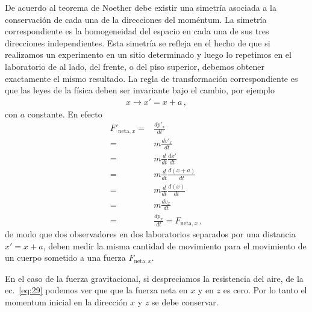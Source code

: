 De acuerdo al teorema de Noether debe existir una simetría asociada a
la conservación de cada una de la direcciones del moméntum. 
La simetría correspondiente es la homogeneidad del espacio en cada una
de sus tres direcciones independientes.
Esta simetría se refleja en el hecho de que si realizamos un
experimento en un sitio determinado y luego lo repetimos en el
laboratorio de al lado, del frente, o del piso superior, debemos
obtener exactamente el mismo resultado. 
La regla de transformación correspondiente es que las leyes de la física deben ser invariante bajo el cambio, por ejemplo
\begin{align*}
  x\to x'=x+a\,,
\end{align*}
con $a$ constante.
En efecto
\begin{align*}
  F'_{\text{neta},x}=&\frac{dp'_{x}}{dt}\nonumber\\
=&m\frac{dv'_{x}}{dt}\nonumber\\
=&m\frac{d}{dt}\frac{dx'}{dt}\nonumber\\
=&m\frac{d}{dt}\frac{d(x+a)}{dt}\nonumber\\
=&m\frac{d}{dt}\frac{d(x)}{dt}\nonumber\\
=&m\frac{dv_{x}}{dt}\nonumber\\
=&\frac{dp_{x}}{dt}=F_{\text{neta},x}\,,
\end{align*}
de modo que dos observadores en dos laboratorios separados por una
distancia $x'=x+a$, deben medir la misma cantidad de movimiento para
el movimiento de un cuerpo sometido a una fuerza $F_{\text{neta},x}$.



En el caso de la fuerza gravitacional, si despreciamos la resistencia del aire, de la ec.~\eqref{eq:29} podemos ver que que la fuerza neta en $x$ y en $z$ es cero. Por lo tanto el momentum inicial en la dirección $x$ y $z$ se debe conservar. 

